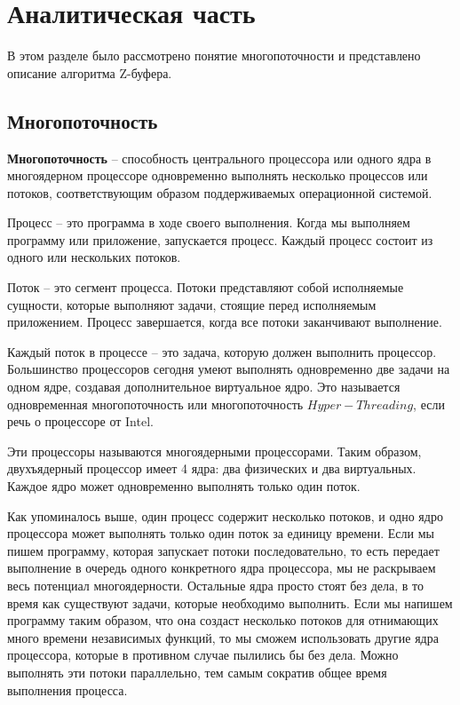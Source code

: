 \chapter{Аналитическая часть}
В этом разделе было рассмотрено понятие многопоточности и представлено описание алгоритма Z-буфера.

\section{Многопоточность}

\textbf{Многопоточность} \cite{threads} -- способность центрального процессора или одного ядра в многоядерном процессоре одновременно выполнять несколько процессов или потоков, соответствующим образом поддерживаемых операционной системой.

Процесс -- это программа в ходе своего выполнения. Когда мы выполняем программу или приложение, запускается процесс. Каждый процесс состоит из одного или нескольких потоков.

Поток -- это сегмент процесса. Потоки представляют собой исполняемые сущности, которые выполняют задачи, стоящие перед исполняемым приложением. Процесс завершается, когда все потоки заканчивают выполнение.

Каждый поток в процессе -- это задача, которую должен выполнить процессор. Большинство процессоров сегодня умеют выполнять одновременно две задачи на одном ядре, создавая дополнительное виртуальное ядро. Это называется одновременная многопоточность или многопоточность $Hyper-Threading$, если речь о процессоре от Intel. 

Эти процессоры называются многоядерными процессорами. Таким образом, двухъядерный процессор имеет 4 ядра: два физических и два виртуальных. Каждое ядро может одновременно выполнять только один поток.

Как упоминалось выше, один процесс содержит несколько потоков, и одно ядро процессора может выполнять только один поток за единицу времени. Если мы пишем программу, которая запускает потоки последовательно, то есть передает выполнение в очередь одного конкретного ядра процессора, мы не раскрываем весь потенциал многоядерности. Остальные ядра просто стоят без дела, в то время как существуют задачи, которые необходимо выполнить. Если мы напишем программу таким образом, что она создаст несколько потоков для отнимающих много времени независимых функций, то мы сможем использовать другие ядра процессора, которые в противном случае пылились бы без дела. Можно выполнять эти потоки параллельно, тем самым сократив общее время выполнения процесса.


